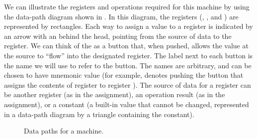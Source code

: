 We can illustrate the registers and operations required for this machine by
using the data-path diagram shown in .  In this diagram, the
registers (, , and ) are represented by rectangles.
Each way to assign a value to a register is indicated by an arrow with an
 behind the head, pointing from the source of data to the register.  We
can think of the  as a button that, when pushed, allows the value at
the source to ``flow'' into the designated register.  The label next to each
button is the name we will use to refer to the button.  The names are
arbitrary, and can be chosen to have mnemonic value (for example, 
denotes pushing the button that assigns the contents of register  to
register ).  The source of data for a register can be another register
(as in the  assignment), an operation result (as in the 
assignment), or a constant (a built-in value that cannot be changed,
represented in a data-path diagram by a triangle containing the constant).

\begin{figure}[tb]
\label{Figure 5.1}
\centering
\begin{comment}
\heading{Figure 5.1:} Data paths for a \acronym{GCD} machine.

\begin{example}
                              ___
+-----+          +-----+     /   \
|  a  |<--(X)----|  b  +--->|  =  |
+--+--+   a<-b   +-+---+     \___/
   |               |  ^        ^
   +------+   +----+  |        |
          |   |      (X) b<-t  |
       .--+---+--.    |       / \
        \  rem  /     |      / O \
         \_____/      |     +-----+
            |         |
           (X) t<-r   |
            |         |
            V         |
         +-----+      |
         |  t  +------+
         +-----+
\end{example}
\end{comment}

\par\bigskip
\noindent
{} Data paths for a  machine.
\end{figure}


